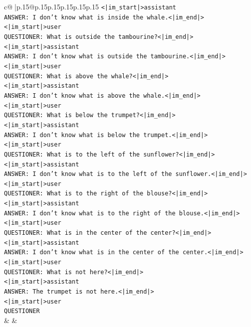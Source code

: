 \documentclass{article}
\begin{document}
{\begin{supertabular}{c@{$\;$}|p{.15\linewidth}@{}p{.15\linewidth}p{.15\linewidth}p{.15\linewidth}p{.15\linewidth}p{.15\linewidth}}
{{{\texttt{<|im\_start|>assistant} \\
\texttt{ANSWER: I don't know what is inside the whale.<|im\_end|>} \\
\texttt{<|im\_start|>user} \\
\texttt{QUESTIONER: What is outside the tambourine?<|im\_end|>} \\
\texttt{<|im\_start|>assistant} \\
\texttt{ANSWER: I don't know what is outside the tambourine.<|im\_end|>} \\
\texttt{<|im\_start|>user} \\
\texttt{QUESTIONER: What is above the whale?<|im\_end|>} \\
\texttt{<|im\_start|>assistant} \\
\texttt{ANSWER: I don't know what is above the whale.<|im\_end|>} \\
\texttt{<|im\_start|>user} \\
\texttt{QUESTIONER: What is below the trumpet?<|im\_end|>} \\
\texttt{<|im\_start|>assistant} \\
\texttt{ANSWER: I don't know what is below the trumpet.<|im\_end|>} \\
\texttt{<|im\_start|>user} \\
\texttt{QUESTIONER: What is to the left of the sunflower?<|im\_end|>} \\
\texttt{<|im\_start|>assistant} \\
\texttt{ANSWER: I don't know what is to the left of the sunflower.<|im\_end|>} \\
\texttt{<|im\_start|>user} \\
\texttt{QUESTIONER: What is to the right of the blouse?<|im\_end|>} \\
\texttt{<|im\_start|>assistant} \\
\texttt{ANSWER: I don't know what is to the right of the blouse.<|im\_end|>} \\
\texttt{<|im\_start|>user} \\
\texttt{QUESTIONER: What is in the center of the center?<|im\_end|>} \\
\texttt{<|im\_start|>assistant} \\
\texttt{ANSWER: I don't know what is in the center of the center.<|im\_end|>} \\
\texttt{<|im\_start|>user} \\
\texttt{QUESTIONER: What is not here?<|im\_end|>} \\
\texttt{<|im\_start|>assistant} \\
\texttt{ANSWER: The trumpet is not here.<|im\_end|>} \\
\texttt{<|im\_start|>user} \\
\texttt{QUESTIONER} \\
            }
        }
    }
    & & \\ \\


\end{supertabular}}
\end{document}
